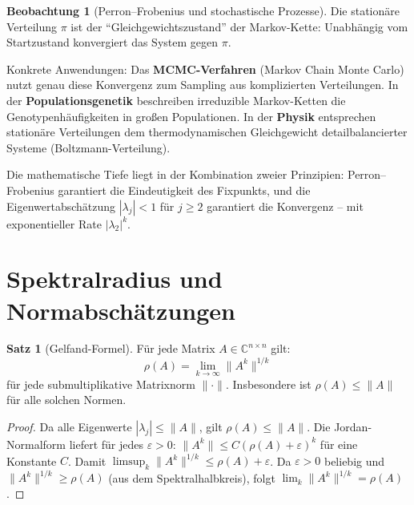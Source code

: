 ﻿\documentclass[a4paper,12pt]{report}
\theoremstyle{definition}
\newtheorem{satz}{Satz}
\newtheorem{beobachtung}{Beobachtung}
\begin{document}
\begin{beobachtung}[Perron--Frobenius und stochastische Prozesse]
    Die stationäre Verteilung $\pi$ ist der ``Gleich\-ge\-wichts\-zustand''
    der Markov-Kette: Unabhängig vom Startzustand konvergiert das System
    gegen $\pi$.

    Konkrete Anwendungen: Das \textbf{MCMC-Verfahren} (Markov Chain Monte Carlo)
    nutzt genau diese Konvergenz zum Sampling aus komplizierten Verteilungen.
    In der \textbf{Populationsgenetik} beschreiben irreduzible Markov-Ketten
    die Genotypenhäufigkeiten in großen Populationen.
    In der \textbf{Physik} entsprechen stationäre Verteilungen dem
    thermodynamischen Gleichgewicht detailbalancierter Systeme (Boltzmann-Verteilung).

    Die mathematische Tiefe liegt in der Kombination zweier Prinzipien:
    Perron--Frobenius garantiert die Eindeutigkeit des Fixpunkts,
    und die Eigenwertabschätzung $|\lambda_j| < 1$ für $j \geq 2$
    garantiert die Konvergenz -- mit exponentieller Rate $|\lambda_2|^k$.
\end{beobachtung}


\section{Spektralradius und Normabschätzungen}

\begin{satz}[Gelfand-Formel]
    Für jede Matrix $A \in \mathbb{C}^{n \times n}$ gilt:
    \[
        \rho(A) = \lim_{k \to \infty} \|A^k\|^{1/k}
    \]
    für jede submultiplikative Matrixnorm $\|\cdot\|$. Insbesondere
    ist $\rho(A) \leq \|A\|$ für alle solchen Normen.
\end{satz}
\begin{proof}
    Da alle Eigenwerte $|\lambda_j| \leq \|A\|$, gilt $\rho(A) \leq \|A\|$.
    Die Jordan-Normalform liefert für jedes $\varepsilon > 0$:
    $\|A^k\| \leq C (\rho(A) + \varepsilon)^k$ für eine Konstante $C$.
    Damit $\limsup_k \|A^k\|^{1/k} \leq \rho(A) + \varepsilon$.
    Da $\varepsilon > 0$ beliebig und $\|A^k\|^{1/k} \geq \rho(A)$
    (aus dem Spektralhalbkreis), folgt $\lim_k \|A^k\|^{1/k} = \rho(A)$.
\end{proof}
\end{document}

